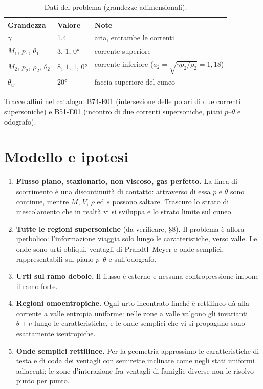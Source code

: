 \documentclass[11pt,a4paper]{article}
\begin{document}
\begin{table}[H]
  \centering
  \begin{tabular}{lll}
    \toprule
    Grandezza & Valore & Note \\
    \midrule
    $\gamma$ & \num{1.4} & aria, entrambe le correnti \\
    $M_1$, $p_1$, $\theta_1$ & $3$, $1$, \ang{0} & corrente superiore \\
    $M_2$, $p_2$, $\rho_2$, $\theta_2$ & $8$, $1$, $1$, \ang{0} & corrente inferiore ($a_2=\sqrt{\gamma p_2/\rho_2}=1{,}18$) \\
    $\theta_w$ & \ang{20} & faccia superiore del cuneo \\
    \bottomrule
  \end{tabular}
  \caption{Dati del problema (grandezze adimensionali).}
\end{table}

Tracce affini nel catalogo: B74-E01 (intersezione delle polari di due correnti supersoniche) e B51-E01 (incontro di
due correnti supersoniche, piani $p$--$\theta$ e odografo).

\section{Modello e ipotesi}
\begin{enumerate}
\item \textbf{Flusso piano, stazionario, non viscoso, gas perfetto.} La linea di scorrimento è una discontinuità
  di contatto: attraverso di essa $p$ e $\theta$ sono continue, mentre $M$, $V$, $\rho$ ed $s$ possono saltare.
  Trascuro lo strato di mescolamento che in realtà vi si sviluppa e lo strato limite sul cuneo.
\item \textbf{Tutte le regioni supersoniche} (da verificare, §8). Il problema è allora iperbolico: l'informazione
  viaggia solo lungo le caratteristiche, verso valle. Le onde sono urti obliqui, ventagli di Prandtl--Meyer e onde
  semplici, rappresentabili sul piano $p$--$\theta$ e sull'odografo.
\item \textbf{Urti sul ramo debole.} Il flusso è esterno e nessuna contropressione impone il ramo forte.
\item \textbf{Regioni omoentropiche.} Ogni urto incontrato finché è rettilineo dà alla corrente a valle entropia
  uniforme: nelle zone a valle valgono gli invarianti $\theta\pm\nu$ lungo le caratteristiche, e le onde semplici
  che vi si propagano sono esattamente isentropiche.
\item \textbf{Onde semplici rettilinee.} Per la geometria approssimo le caratteristiche di testa e di coda dei
  ventagli con semirette inclinate come negli stati uniformi adiacenti; le zone d'interazione fra ventagli di
  famiglie diverse non le risolvo punto per punto.
\end{enumerate}
\end{document}
